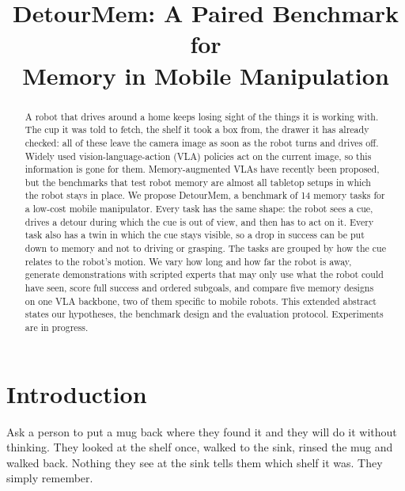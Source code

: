 \documentclass[conference]{IEEEtran}
\begin{document}
\title{DetourMem: A Paired Benchmark for\\Memory in Mobile Manipulation}


\maketitle

\begin{abstract}
A robot that drives around a home keeps losing sight of the things it is working with. The cup it was told to fetch, the shelf it took a box from, the drawer it has already checked: all of these leave the camera image as soon as the robot turns and drives off. Widely used vision-language-action (VLA) policies act on the current image, so this information is gone for them. Memory-augmented VLAs have recently been proposed, but the benchmarks that test robot memory are almost all tabletop setups in which the robot stays in place. We propose DetourMem, a benchmark of 14 memory tasks for a low-cost mobile manipulator. Every task has the same shape: the robot sees a cue, drives a detour during which the cue is out of view, and then has to act on it. Every task also has a twin in which the cue stays visible, so a drop in success can be put down to memory and not to driving or grasping. The tasks are grouped by how the cue relates to the robot's motion. We vary how long and how far the robot is away, generate demonstrations with scripted experts that may only use what the robot could have seen, score full success and ordered subgoals, and compare five memory designs on one VLA backbone, two of them specific to mobile robots. This extended abstract states our hypotheses, the benchmark design and the evaluation protocol. Experiments are in progress.
\end{abstract}

\IEEEpeerreviewmaketitle

\section{Introduction}

Ask a person to put a mug back where they found it and they will do it without thinking. They looked at the shelf once, walked to the sink, rinsed the mug and walked back. Nothing they see at the sink tells them which shelf it was. They simply remember.
\end{document}
